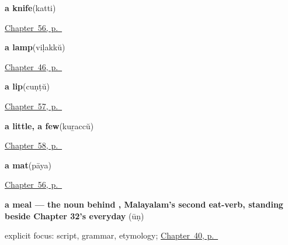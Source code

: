 \noindent\begin{minipage}[t]{\linewidth}
\raggedright
\textbf{a knife}\enspace\emph{}\enspace(katti)\par
\footnotesize \hyperref[ch:ml-things-about-the-house]{Chapter~56, p.~\pageref*{ch:ml-things-about-the-house}}
\end{minipage}\par\smallskip

\noindent\begin{minipage}[t]{\linewidth}
\raggedright
\textbf{a lamp}\enspace\emph{}\enspace(viḷakkŭ)\par
\footnotesize \hyperref[ch:ml-ask-for]{Chapter~46, p.~\pageref*{ch:ml-ask-for}}
\end{minipage}\par\smallskip

\noindent\begin{minipage}[t]{\linewidth}
\raggedright
\textbf{a lip}\enspace\emph{}\enspace(cuṇṭŭ)\par
\footnotesize \hyperref[ch:ml-five-more-of-the-body]{Chapter~57, p.~\pageref*{ch:ml-five-more-of-the-body}}
\end{minipage}\par\smallskip

\noindent\begin{minipage}[t]{\linewidth}
\raggedright
\textbf{a little, a few}\enspace\emph{}\enspace(kuṟaccŭ)\par
\footnotesize \hyperref[ch:ml-five-more-short-answers]{Chapter~58, p.~\pageref*{ch:ml-five-more-short-answers}}
\end{minipage}\par\smallskip

\noindent\begin{minipage}[t]{\linewidth}
\raggedright
\textbf{a mat}\enspace\emph{}\enspace(pāya)\par
\footnotesize \hyperref[ch:ml-things-about-the-house]{Chapter~56, p.~\pageref*{ch:ml-things-about-the-house}}
\end{minipage}\par\smallskip

\noindent\begin{minipage}[t]{\linewidth}
\raggedright
\textbf{a meal — the noun behind , Malayalam's second eat-verb, standing beside Chapter 32's everyday }\enspace\emph{}\enspace(ūṇ)\par
\footnotesize explicit focus: script, grammar, etymology; \hyperref[ch:ml-the-meal]{Chapter~40, p.~\pageref*{ch:ml-the-meal}}
\end{minipage}\par\smallskip

